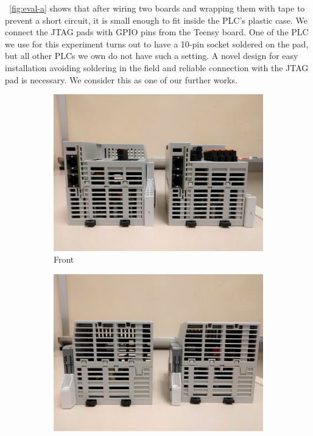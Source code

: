 ~\autoref{fig:eval-a} shows that after wiring two boards and wrapping them with tape to prevent a short circuit, it is small enough to fit inside the PLC's plastic case. We connect the JTAG pads with GPIO pins from the Teensy board. One of the PLC we use for this experiment turns out to have a 10-pin socket soldered on the pad, but all other PLCs we own do not have such a setting. A novel design for easy installation avoiding soldering in the field and reliable connection with the JTAG pad is necessary. We consider this as one of our further works.

\begin{figure}[h]
	\centering
    \begin{subfigure}[b]{0.22\textwidth}
    	\centering
	\includegraphics[width=1\textwidth]{figures/eval-b2}
        \vspace{-0.15in}
        \caption{Front}
		\label{fig:eval-b1}
	\end{subfigure}
	\begin{subfigure}[b]{0.22\textwidth}
    	\centering
	\includegraphics[width=1\textwidth]{figures/eval-b1}

\end{subfigure}
\end{figure}

